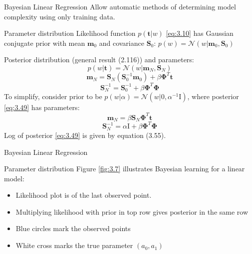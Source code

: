 \documentclass[9pt]{beamer}
\begin{document}
\begin{frame}{Bayesian Linear Regression}
    Allow automatic methods of determining model complexity using only training data.
    \begin{alertblock}{Parameter distribution}
        Likelihood function $p(\mathbf{t}|w)$ \eqref{eq:3.10} has Gaussian conjugate prior with mean $\mathbf{m}_0$ and covariance $\mathbf{S}_0$: $p(w) = \mathcal{N}(w|\mathbf{m}_0, \mathbf{S}_0)$

        Posterior distribution (general result (2.116)) and parameters:
        \[ p(w|\mathbf{t}) = \mathcal{N}(w|\mathbf{m}_N, \mathbf{S}_N) \tag{3.49} \label{eq:3.49}\]
        \[ \mathbf{m}_N = \mathbf{S}_N(\mathbf{S}_0^{-1}\mathbf{m}_0) + \beta \mathbf{\Phi}^T \mathbf{t} \tag{3.50} \label{eq:3.50} \]
        \[ \mathbf{S}_N^{-1} = \mathbf{S}_0^{-1} + \beta \mathbf{\Phi}^T \mathbf{\Phi} \tag{3.51} \label{eq:3.51} \]
        To simplify, consider prior to be $p(w|\alpha) = \mathcal{N}(w|0, \alpha^{-1}\mathbf{\mathrm{I}})$, where posterior \eqref{eq:3.49} has parameters:
        \[ \mathbf{m}_N = \beta \mathbf{S}_N \mathbf{\Phi}^T \mathbf{t} \tag{3.53} \label{eq:3.53} \]
        \[ \mathbf{S}_N^{-1} = \alpha \mathrm{I} + \beta \mathbf{\Phi}^T \mathbf{\Phi} \tag{3.54} \label{eq:3.54} \]
        Log of posterior \eqref{eq:3.49} is given by equation (3.55).
    \end{alertblock}
\end{frame}

\begin{frame}{Bayesian Linear Regression}
    \begin{alertblock}{Parameter distribution}
        Figure \ref{fig:3.7} illustrates Bayesian learning for a linear model:
        \begin{itemize}
            \item Likelihood plot is of the last observed point.
            \item Multiplying likelihood with prior in top row gives posterior in the same row
            \item Blue circles mark the observed points
            \item White cross marks the true parameter $(a_0, a_1)$
        \end{itemize}
    \end{alertblock}
\end{frame}
\end{document}
